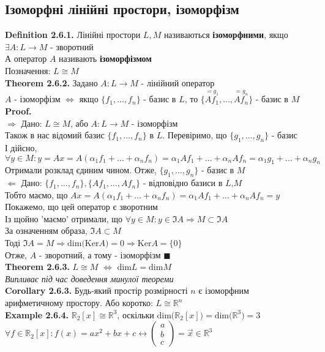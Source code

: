 \documentclass[a4paper, 14pt]{extarticle}
\def\defin#1{\textbf{Definition {#1}}}
\def\ex#1{\textbf{Example {#1}}}
\def\th#1{\textbf{Theorem {#1}}}
\def\crl#1{\textbf{Corollary {#1}}}
\def\proof{\textbf{Proof.}\\}
\def\bigline{\vspace{5mm}\\}
\def\qed{$\blacksquare$}
\def\dim#1{\textrm{dim} {#1}}
\begin{document}
	\subsection{Ізоморфні лінійні простори, ізоморфізм}
	\defin{2.6.1.} Лінійні простори $L,M$ називаються \textbf{ізоморфними}, якщо $\exists A: L \to M$ - зворотний\\
	А оператор $A$ називають \textbf{ізоморфізмом}\\
	Позначення: $L \cong M$
	\bigline
	\th{2.6.2.} Задано $A: L \to M$ - лінійний оператор\\
	$A$ - ізоморфізм $\iff$ якщо $\{f_1,\dots,f_n\}$ - базис в $L$, то $\{\overset{=g_1}{Af_1},\dots, \overset{=g_n}{Af_n}\}$ - базис в $M$\\
	\proof
	$\boxed{\Rightarrow}$ Дано: $L \cong M$, або $A: L \to M$ - ізоморфізм\\
	Також в нас відомий базис $\{f_1,\dots,f_n\}$ в $L$. Перевіримо, що $\{g_1,\dots,g_n\}$ - базис\\
	І дійсно, $\forall y \in M: y = Ax = A(\alpha_1 f_1 + \dots + \alpha_n f_n) = \alpha_1 Af_1 + \dots + \alpha_n Af_n = \alpha_1 g_1 + \dots + \alpha_n g_n$\\
	Отримали розклад єдиним чином. Отже, $\{g_1,\dots,g_n\}$ - базис в $M$
	\bigline
	$\boxed{\Leftarrow}$ Дано: $\{f_1,\dots,f_n\}, \{Af_1,\dots,Af_n\}$ - відповідно базиси в $L$,$M$\\
	Тобто маємо, що $Ax = A(\alpha_1 f_1 + \dots + \alpha_n f_n) = \alpha_1 Af_1 + \dots + \alpha_n Af_n = y$\\
	Покажемо, що цей оператор є зворотним\\
	Із щойно 'маємо' отримали, що $\forall y \in M: y \in \Im A \Rightarrow M \subset \Im A$\\
	За означенням образа, $\Im A \subset M$\\
	Тоді $\Im A = M \Rightarrow \dim(\textrm{Ker} A) = 0 \Rightarrow \textrm{Ker} A = \{0\}$\\
	Отже, $A$ - зворотний, а тому - ізоморфізм \qed
	\bigline
	\th{2.6.3.} $L \cong M$ $\iff$ $\dim L = \dim M$\\
	\textit{Випливає під час доведення минулої теореми}
	\bigline
	\crl{2.6.3.} Будь-який простір розмірності $n$ є ізоморфним \\ арифметичному простору. Або коротко: $L \cong \mathbb{R}^n$ \bigline
	\ex{2.6.4.} $\mathbb{R}_2[x] \cong \mathbb{R}^3$, оскільки $\dim(\mathbb{R}_2[x]) = \dim (\mathbb{R}^3) = 3$\\
	$\forall f \in \mathbb{R}_2[x]: f(x) = ax^2 + bx +c \leftrightarrow \begin{pmatrix}
	a \\ b \\ c
	\end{pmatrix} = \vec{x} \in \mathbb{R}^3$
	
\end{document}
